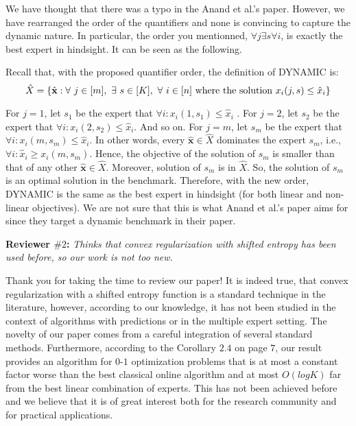\documentclass[12pt]{article}
\begin{document}
We have thought that there was a typo in the Anand et al.'s paper. However, we have rearranged the order of the quantifiers and none is convincing to capture the dynamic nature. In particular, the order you mentionned, $\forall j \exists s \forall i$, is exactly the best expert in hindsight. It can be seen as the following.

Recall that, with the proposed quantifier order, the definition of DYNAMIC is:
$$
\hat{X} = \{\hat{\textbf{x}} : \forall\ j \in [m], \ \exists\ s \in [K], \ \forall\ i \in [n] \textnormal{ where the solution } x_i(j,s) \le \hat{x}_i \}
$$

For $j = 1$, let $s_{1}$ be the expert that $\forall i: x_i(1,s_{1}) \le \hat{x}_i$ . 
For $j = 2$, let $s_{2}$ be the expert that $\forall i: x_i(2,s_{2}) \le \hat{x}_i$.
And so on.
For $j = m$, let $s_{m}$ be the expert that $\forall i : x_i(m,s_{m}) \le \hat{x}_i$.
In other words, every $\hat{\textbf{x}} \in \hat{X}$ dominates the expert $s_{m}$, i.e., $\forall i :  \hat{x}_i \geq x_i(m,s_{m})$. 
Hence, the objective of the solution of $s_{m}$ is smaller than that of any other $\hat{\textbf{x}} \in \hat{X}$. Moreover, solution of $s_{m}$ is in $\hat{X}$. 
So, the solution of $s_{m}$ is an optimal solution in the benchmark. Therefore, with the new order, DYNAMIC is the same as the best expert in hindsight (for both linear and non-linear objectives). We are not sure that this is what Anand et al.'s paper aims for since they target a dynamic benchmark in their paper.




\vspace{1cm}
\noindent \textbf{Reviewer $\#2$:} 
\textit{\color{red} Thinks that convex regularization with shifted entropy has been used before, so our work is not too new.}

Thank you for taking the time to review our paper! It is indeed true, that convex regularization with a shifted entropy function is a standard technique in the literature, however, according to our knowledge, it has not been studied in the context of algorithms with predictions or in the multiple expert setting. The novelty of our paper comes from a careful integration of several standard methods. Furthermore, according to the Corollary $2.4$ on page $7$, our result provides an algorithm for $0$-$1$ optimization problems that is at most a constant factor worse than the best classical online algorithm and at most $O(log K)$ far from the best linear combination of experts. This has not been achieved before and we believe that it is of great interest both for the research community and for practical applications.
\end{document}

